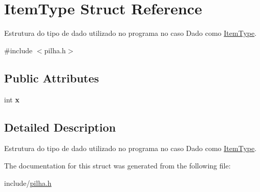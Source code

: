 \hypertarget{struct_item_type}{}\section{Item\+Type Struct Reference}
\label{struct_item_type}


Estrutura do tipo de dado utilizado no programa no caso Dado como \mbox{\hyperlink{struct_item_type}{Item\+Type}}.  




{\ttfamily \#include $<$pilha.\+h$>$}

\subsection*{Public Attributes}
\begin{DoxyCompactItemize}
\item 
\mbox{\label{struct_item_type_ac607cb8d69e5763265e33fda4c1867a7}} 
int {\bfseries x}
\end{DoxyCompactItemize}


\subsection{Detailed Description}
Estrutura do tipo de dado utilizado no programa no caso Dado como \mbox{\hyperlink{struct_item_type}{Item\+Type}}. 

The documentation for this struct was generated from the following file\+:\begin{DoxyCompactItemize}
\item 
include/\mbox{\hyperlink{pilha_8h}{pilha.\+h}}\end{DoxyCompactItemize}
